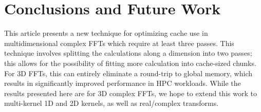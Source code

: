 \documentclass{gtac}
\theoremstyle{problemstyle}
\begin{document}


\section{Conclusions and Future Work}

This article presents a new technique for optimizing cache use in multidimensional complex FFTs which require at least three passes.  This
technique involves splitting the calculations along a dimension into two passes;
this allows for the possibility of fitting more calculation into
cache-sized chunks.  For 3D FFTs, this can entirely eliminate a
round-trip to global memory, which results in significantly improved performance in HPC workloads.  While the results presented here are for 3D complex FFTs, we hope to extend this work to multi-kernel 1D and 2D kernels, as well as
real/complex transforms.

\begingroup
\let\itshape\upshape


\endgroup

\end{document}
